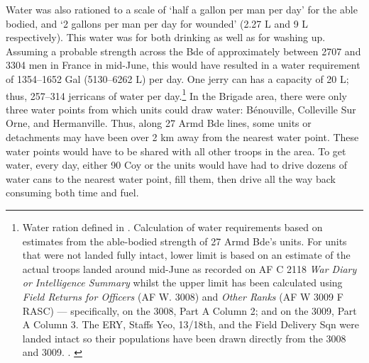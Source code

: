 \documentclass[noraggedright]{turabian-researchpaper}
\newcommand{\DMaint}{27 Armd Bde Maintenance Project 2nd Edition, 20 May 1944}
\begin{document}
Water was also rationed to a scale of `half
a gallon per man per day' for the able bodied, and `2 gallons per man per day
for wounded' (2.27 L and 9 L respectively).  This water was for both drinking
as well as for washing up.  Assuming a probable strength across the Bde of
approximately between 2707 and 3304 men in France in mid-June, this would 
have resulted in a water requirement of 1354--1652 Gal (5130--6262 L) per day.
One jerry can has a capacity of 20 L; thus, 257--314 jerricans of water per 
day.\footnote{ %
	Water ration defined in \cite[\DMaint][s. 13 para 1]{27wd}.  
	Calculation of water requirements based on estimates from the 
	able-bodied strength of 27 Armd Bde's units.  For units that were not
	landed fully intact, lower limit is based on an estimate of the actual
	troops landed around mid-June as recorded on AF C 2118 \textit{War
	Diary or Intelligence Summary} whilst the upper limit has been 
	calculated using \textit{Field Returns for Officers} (AF W. 3008) and 
	\textit{Other Ranks} (AF W 3009 F RASC) --- specifically, on the 3008,
	Part A Column 2; and on the 3009, Part A Column 3.  The ERY, Staffs 
	Yeo, 13/18th, and the Field Delivery Sqn were landed intact so their
	populations have been drawn directly from the 3008 and 3009.
	\cite[24 June 1944 Field Returns]{27wd}
	\cite[24 June 1944 Field Returns]{erywd}
	\cite[10 June 1944 Field Returns]{staffswd}
	\cite[Mid-June returns missing][3 June 1944 Field Returns]{1318wd}
	\cite[24 June 1944 Field Returns]{27ofp}
	\cite[Lower limit 7-24 June, upper limit 24 June 1944 Field Returns]
		{27sigs}
	\cite[Lower limit from 7--8 June figures for groups landed, upper
		limit 17 June 1944 Field Returns]{27reme}
	\cite[17 and 24 June Field Returns]{266wd}
	\cite[90 Coy had an approximate ratio of 0.37 vehicles per man for
		early-mid June.  Lower limit extrapolated from vehicle totals
		whilst upper limit established from 17 June 1944 Field Returns]
		{90wd}.
	\label{manpower}
} 
In the Brigade area, there were only
three water points from which units could draw water:  Bénouville, Colleville
Sur Orne, and Hermanville.  Thus, along 27 Armd Bde lines, some units or 
detachments may have been over 2 km away from the nearest water 
point.\autocite[June Adm Order No. 1][Para 4]{27wd}  These water points would
have to be shared with all other troops in the area.  To get water,
every day, either 90 Coy or the units would have had to drive dozens of water
cans to the nearest water point, fill them, then drive all the way back
consuming both time and fuel.  
\end{document}
